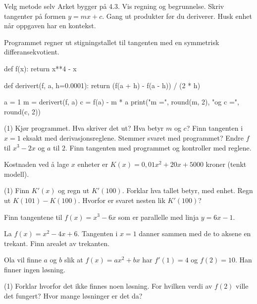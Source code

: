 
\begin{infoboks}{Velg metode selv}
Arket bygger på 4.3. Vis regning og begrunnelse. Skriv tangenter på formen $y = mx + c$.
Gang ut produkter før du deriverer. Husk enhet når oppgaven har en kontekst.
\end{infoboks}


Programmet regner ut stigningstallet til tangenten med en symmetrisk differansekvotient.
\begin{kode}
def f(x):
    return x**4 - x

def derivert(f, a, h=0.0001):
    return (f(a + h) - f(a - h)) / (2 * h)

a = 1
m = derivert(f, a)
c = f(a) - m * a
print("m =", round(m, 2), "og c =", round(c, 2))
\end{kode}
\begin{tasks}(1)
  \task Kjør programmet. Hva skriver det ut? Hva betyr $m$ og $c$?
  \task Finn tangenten i $x = 1$ eksakt med derivasjonsreglene. Stemmer svaret med programmet?
  \task Endre $f$ til $x^3 - 2x$ og $a$ til $2$. Finn tangenten med programmet og kontroller med reglene.
\end{tasks}

Kostnaden ved å lage $x$ enheter er $K(x) = 0,01x^2 + 20x + 5000$ kroner (tenkt modell).
\begin{tasks}(1)
  \task Finn $K'(x)$ og regn ut $K'(100)$. Forklar hva tallet betyr, med enhet.
  \task Regn ut $K(101) - K(100)$. Hvorfor er svaret nesten lik $K'(100)$?
\end{tasks}

Finn tangentene til $f(x) = x^3 - 6x$ som er parallelle med linja $y = 6x - 1$.

La $f(x) = x^2 - 4x + 6$. Tangenten i $x = 1$ danner sammen med de to aksene en trekant.
Finn arealet av trekanten.


Ola vil finne $a$ og $b$ slik at $f(x) = ax^2 + bx$ har $f'(1) = 4$ og $f(2) = 10$. Han finner ingen løsning.
\begin{tasks}(1)
  \task Forklar hvorfor det ikke finnes noen løsning.
  \task For hvilken verdi av $f(2)$ ville det fungert? Hvor mange løsninger er det da?
\end{tasks}


